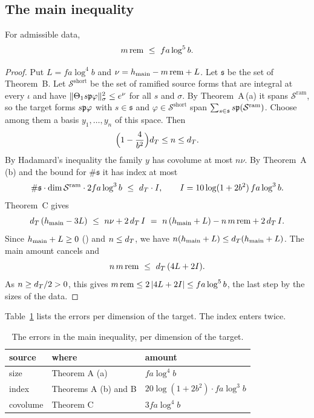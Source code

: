 \subsection{The main inequality}

\begin{theorem}\label{main:thm:star}
For admissible data,
\[
  m\,\mathrm{rem} \ \le\ f a\log^5 b .
\]
\end{theorem}

\begin{proof}
Put $L = f a\log^4 b$ and $\nu = h_{\mathrm{main}} - m\,\mathrm{rem} + L$. Let $\mathfrak{s}$ be the set of Theorem~B. Let
$\mathcal{S}^{\mathrm{short}}$ be the set of ramified source forms that are integral at every
$\iota$ and have $\lVert\Theta_1 s\mathfrak{p}\varphi\rVert_\sigma^2 \le e^\nu$ for all $s$ and $\sigma$. By
Theorem~A\,(a) it spans $\mathcal{S}^{\mathrm{ram}}$, so the target forms $s\mathfrak{p}\varphi$ with
$s \in \mathfrak{s}$ and $\varphi \in \mathcal{S}^{\mathrm{short}}$ span
$\sum_{s\in \mathfrak{s}} s\mathfrak{p}(\mathcal{S}^{\mathrm{ram}})$. Choose among them a basis $y_1, \dots, y_n$ of
this space. Then
\[
  \Bigl(1 - \frac{4}{b^2}\Bigr)d_T \le n \le d_T .
\]
By Hadamard's inequality the family $y$ has covolume at most $n\nu$. By Theorem~A\,(b) and the
bound for $\#\mathfrak{s}$ it has index at most
\[
  \#\mathfrak{s}\cdot\dim\mathcal{S}^{\mathrm{ram}}\cdot 2 f a\log^3 b \ \le\ d_T\cdot I,
  \qquad I = 10\log(1+2b^2)\, f a\log^3 b .
\]
Theorem~C gives
\[
  d_T\,(h_{\mathrm{main}} - 3L) \ \le\ n\nu + 2\,d_T\, I \ =\ n\,(h_{\mathrm{main}} + L) - n\,m\,\mathrm{rem} + 2\,d_T\, I .
\]
Since $h_{\mathrm{main}} + L \ge 0$ () and $n \le d_T$, we have
$n(h_{\mathrm{main}} + L) \le d_T(h_{\mathrm{main}} + L)$. The main amount cancels and
\[
  n\,m\,\rem \ \le\ \dT\,(4L + 2I).
\]
As $n \ge d_T/2 > 0$, this gives $m\,\mathrm{rem} \le 2\,\lvert4L + 2I\rvert \le f a\log^5 b$, the last step by
the sizes of the data.
\end{proof}

Table~\ref{main:tab:errors} lists the errors per dimension of the target. The index enters twice.

\begin{table}[ht]
\centering
\begin{tabular}{lll}
\toprule
source & where & amount \\
\midrule
size & Theorem A (a) & $f a\log^4 b$ \\
index & Theorems A (b) and B & $20\log(1+2b^2)\cdot f a\log^3 b$ \\
covolume & Theorem C & $3 f a\log^4 b$ \\
\bottomrule
\end{tabular}
\caption{The errors in the main inequality, per dimension of the target.}
\label{main:tab:errors}
\end{table}

